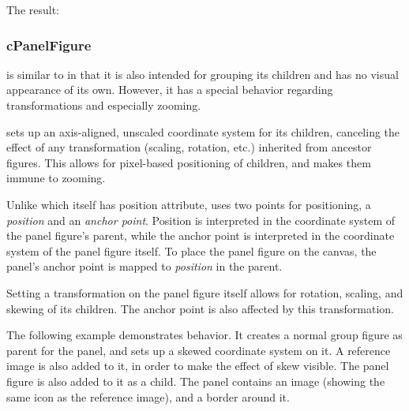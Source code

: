 
The result:

\begin{center}

\end{center}


\subsubsection{cPanelFigure}
\label{sec:graphics:panelfigure}

 is similar to  in that it is also
intended for grouping its children and has no visual appearance of its own.
However, it has a special behavior regarding transformations and especially zooming.

 sets up an axis-aligned, unscaled coordinate system for
its children, canceling the effect of any transformation (scaling, rotation,
etc.) inherited from ancestor figures. This allows for pixel-based positioning
of children, and makes them immune to zooming.

Unlike  which itself has position attribute,
 uses two points for positioning, a \textit{position} and
an \textit{anchor point}. Position is interpreted in the coordinate system of
the panel figure's parent, while the anchor point is interpreted in the
coordinate system of the panel figure itself. To place the panel figure on the
canvas, the panel's anchor point is mapped to \textit{position} in the
parent.

Setting a transformation on the panel figure itself allows for rotation,
scaling, and skewing of its children. The anchor point is also affected by this
transformation.

The following example demonstrates  behavior. It
creates a normal group figure as parent for the panel, and sets up a
skewed coordinate system on it. A reference image is also added to it,
in order to make the effect of skew visible. The panel figure is also
added to it as a child. The panel contains an image (showing the same icon
as the reference image), and a border around it.

